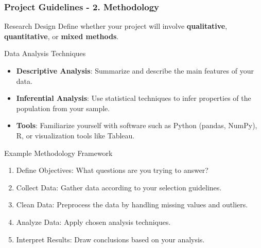 \documentclass{beamer}
\begin{document}
\begin{frame}[fragile]
    \frametitle{Project Guidelines - 2. Methodology}
    \begin{block}{Research Design}
        Define whether your project will involve \textbf{qualitative}, \textbf{quantitative}, or \textbf{mixed methods}.
    \end{block}

    \begin{block}{Data Analysis Techniques}
        \begin{itemize}
            \item \textbf{Descriptive Analysis}: Summarize and describe the main features of your data.
            \item \textbf{Inferential Analysis}: Use statistical techniques to infer properties of the population from your sample.
            \item \textbf{Tools}: Familiarize yourself with software such as Python (pandas, NumPy), R, or visualization tools like Tableau.
        \end{itemize}
    \end{block}

    \begin{block}{Example Methodology Framework}
        \begin{enumerate}
            \item Define Objectives: What questions are you trying to answer?
            \item Collect Data: Gather data according to your selection guidelines.
            \item Clean Data: Preprocess the data by handling missing values and outliers.
            \item Analyze Data: Apply chosen analysis techniques.
            \item Interpret Results: Draw conclusions based on your analysis.
        \end{enumerate}
    \end{block}
\end{frame}
\end{document}
